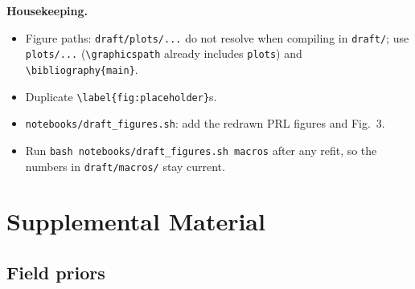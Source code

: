 \documentclass[%
 reprint,
 amsmath,amssymb,
 aps,
 prl,
 nofootinbib,nobibnotes,
]{revtex4-2}
\newcommand{\red}[1]{{\color{Red} #1}}
\begin{document}
\red{\textbf{Housekeeping.}
\begin{itemize}
\item Figure paths: \texttt{draft/plots/...} do not resolve when compiling in \texttt{draft/}; use \texttt{plots/...} (\texttt{\textbackslash graphicspath} already includes \texttt{plots}) and \texttt{\textbackslash bibliography\{main\}}.
\item Duplicate \texttt{\textbackslash label\{fig:placeholder\}}s.
\item \texttt{notebooks/draft\_figures.sh}: add the redrawn PRL figures and Fig.~3.
\item Run \texttt{bash notebooks/draft\_figures.sh macros} after any refit, so the numbers in \texttt{draft/macros/} stay current.
\end{itemize}}



\clearpage
\setcounter{equation}{0}
\renewcommand{\theequation}{S\arabic{equation}}

\section*{Supplemental Material}

\subsection*{Field priors}
\end{document}
